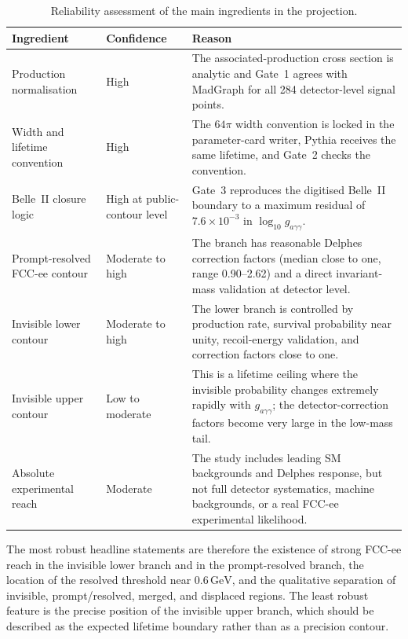 \documentclass[12pt,a4paper]{article}
\newcommand{\gagg}{g_{a\gamma\gamma}}
\newcommand{\GeV}{\,\text{GeV}}
\begin{document}
\begin{table}[h]
    \centering
    \caption{Reliability assessment of the main ingredients in the projection.}
    \label{tab:confidence}
    \begin{tabular}{p{}p{}p{}}
        \toprule
        Ingredient & Confidence & Reason \\
        \midrule
        Production normalisation &
        High &
        The associated-production cross section is analytic and Gate~1 agrees
        with MadGraph for all 284 detector-level signal points. \\
        Width and lifetime convention &
        High &
        The $64\pi$ width convention is locked in the parameter-card writer,
        Pythia receives the same lifetime, and Gate~2 checks the convention. \\
        Belle~II closure logic &
        High at public-contour level &
        Gate~3 reproduces the digitised Belle~II boundary to a maximum
        residual of $7.6\times10^{-3}$ in $\log_{10}\gagg$. \\
        Prompt-resolved FCC-ee contour &
        Moderate to high &
        The branch has reasonable Delphes correction factors
        (median close to one, range 0.90--2.62) and a direct invariant-mass
        validation at detector level. \\
        Invisible lower contour &
        Moderate to high &
        The lower branch is controlled by production rate, survival
        probability near unity, recoil-energy validation, and correction
        factors close to one. \\
        Invisible upper contour &
        Low to moderate &
        This is a lifetime ceiling where the invisible probability changes
        extremely rapidly with $\gagg$; the detector-correction factors become
        very large in the low-mass tail. \\
        Absolute experimental reach &
        Moderate &
        The study includes leading SM backgrounds and Delphes response, but not
        full detector systematics, machine backgrounds, or a real FCC-ee
        experimental likelihood. \\
        \bottomrule
    \end{tabular}
\end{table}

The most robust headline statements are therefore the existence of strong
FCC-ee reach in the invisible lower branch and in the prompt-resolved branch,
the location of the resolved threshold near $0.6\GeV$, and the qualitative
separation of invisible, prompt/resolved, merged, and displaced regions. The
least robust feature is the precise position of the invisible upper branch,
which should be described as the expected lifetime boundary rather than as a
precision contour.
\end{document}
